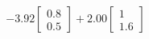 \documentclass[preview]{standalone}
\begin{document}
\begin{align*}
-3.92 \begin{bmatrix} 0.8 \\ 0.5 \end{bmatrix} + 2.00 \begin{bmatrix} 1 \\ 1.6 \end{bmatrix}
\end{align*}
\end{document}
